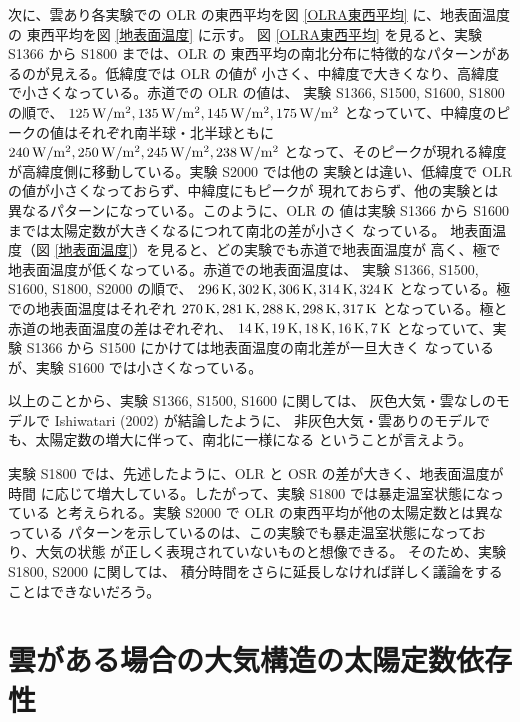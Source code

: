 \documentclass[body]{subfiles}
\begin{document}
次に、雲あり各実験での OLR の東西平均を図 \ref{OLRA東西平均} に、地表面温度の
東西平均を図 \ref{地表面温度} に示す。
図 \ref{OLRA東西平均} を見ると、実験 S1366 から S1800 までは、OLR の
東西平均の南北分布に特徴的なパターンがあるのが見える。低緯度では OLR の値が
小さく、中緯度で大きくなり、高緯度で小さくなっている。赤道での OLR の値は、
実験 S1366, S1500, S1600, S1800 の順で、
\(125\hmu{W/m^2},135\hmu{W/m^2},145\hmu{W/m^2},175\hmu{W/m^2}\)
となっていて、中緯度のピークの値はそれぞれ南半球・北半球ともに
\(240\hmu{W/m^2},250\hmu{W/m^2},245\hmu{W/m^2},238\hmu{W/m^2}\)
となって、そのピークが現れる緯度が高緯度側に移動している。実験 S2000 では他の
実験とは違い、低緯度で OLR の値が小さくなっておらず、中緯度にもピークが
現れておらず、他の実験とは異なるパターンになっている。このように、OLR の
値は実験 S1366 から S1600 までは太陽定数が大きくなるにつれて南北の差が小さく
なっている。
地表面温度（図 \ref{地表面温度}）を見ると、どの実験でも赤道で地表面温度が
高く、極で地表面温度が低くなっている。赤道での地表面温度は、
実験 S1366, S1500, S1600, S1800, S2000 の順で、
\(296\hmu{K},302\hmu{K},306\hmu{K},314\hmu{K},324\hmu{K}\)
となっている。極での地表面温度はそれぞれ
\(270\hmu{K},281\hmu{K},288\hmu{K},298\hmu{K},317\hmu{K}\)
となっている。極と赤道の地表面温度の差はぞれぞれ、
\(14\hmu{K},19\hmu{K},18\hmu{K},16\hmu{K},7\hmu{K}\)
となっていて、実験 S1366 から S1500 にかけては地表面温度の南北差が一旦大きく
なっているが、実験 S1600 では小さくなっている。

以上のことから、実験 S1366, S1500, S1600 に関しては、
灰色大気・雲なしのモデルで Ishiwatari \etal (2002) が結論したように、
非灰色大気・雲ありのモデルでも、太陽定数の増大に伴って、南北に一様になる
ということが言えよう。

実験 S1800 では、先述したように、OLR と OSR の差が大きく、地表面温度が時間
に応じて増大している。したがって、実験 S1800 では暴走温室状態になっている
と考えられる。実験 S2000 で OLR の東西平均が他の太陽定数とは異なっている
パターンを示しているのは、この実験でも暴走温室状態になっており、大気の状態
が正しく表現されていないものと想像できる。
そのため、実験 S1800, S2000 に関しては、
積分時間をさらに延長しなければ詳しく議論をすることはできないだろう。

\afterpage{\clearpage}

\section{雲がある場合の大気構造の太陽定数依存性}
\end{document}
